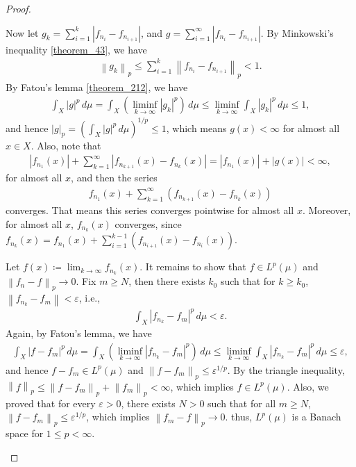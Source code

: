 \documentclass[11pt]{book}
\theoremstyle{definition}
\numberwithin{equation}{chapter}
\begin{document}
\begin{proof}
\begin{enumerate}[label=(\alph*)]
    Now let $g_k = \sum^k_{i=1} \left|f_{n_i} - f_{n_{i+1}}\right|$, and $g = \sum^\infty_{i=1} \left|f_{n_i} - f_{n_{i+1}}\right|$. By Minkowski's inequality \ref{theorem_43}, we have
    \begin{align*}
        \left\|g_k\right\|_p \leq \sum^k_{i=1} \left\|f_{n_i} - f_{n_{i+1}}\right\|_p < 1.
    \end{align*}
    By Fatou's lemma \ref{theorem_212}, we have
    \begin{align*}
        \int_X \left|g\right|^p\,d\mu = \int_X \left(\liminf_{k\to\infty} \left|g_k\right|^p\right) \,d\mu \leq \liminf_{k\to\infty} \int_X \left|g_k\right|^p\,d\mu \leq 1,
    \end{align*}
    and hence $\left|g\right|_p = \left(\int_X \left|g\right|^p\,d\mu\right)^{1/p} \leq 1$, which means $g(x) < \infty$ for almost all $x \in X$. Also, note that
    \begin{align*}
        \left|f_{n_1}(x)\right| + \sum^\infty_{k=1} \left|f_{n_{k+1}}(x) - f_{n_k}(x)\right| = \left|f_{n_1}(x)\right| + \left|g(x)\right| < \infty,
    \end{align*}
    for almost all $x$, and then the series
    \begin{align*}
        f_{n_1}(x) + \sum^\infty_{k=1} \left(f_{n_{k+1}}(x) - f_{n_k}(x)\right)
    \end{align*}
    converges. That means this series converges pointwise for almost all $x$. Moreover, for almost all $x$, $f_{n_k}(x)$ converges, since $f_{n_k}(x) = f_{n_1}(x) + \sum^{k-1}_{i=1} \left(f_{n_{i+1}}(x) - f_{n_i}(x)\right)$. 

    Let $f(x) \coloneqq \lim_{k\to\infty} f_{n_k}(x)$. It remains to show that $f \in L^p(\mu)$ and $\left\|f_n - f\right\|_p \to 0$. Fix $m \geq N$, then there exists $k_0$ such that for $k \geq k_0$, $\left\|f_{n_k} - f_m \right\| < \varepsilon$, i.e.,
    \begin{align*}
        \int_X \left|f_{n_k} - f_m \right|^p \,d\mu < \varepsilon.
    \end{align*}
    Again, by Fatou's lemma, we have
    \begin{align*}
        \int_X \left|f - f_m \right|^p \,d\mu = \int_X \left(\liminf_{k\to\infty} \left|f_{n_k} - f_m \right|^p \right) \,d\mu \leq \liminf_{k\to\infty} \int_X \left|f_{n_k} - f_m \right|^p \,d\mu \leq \varepsilon,
    \end{align*}
    and hence $f - f_m \in L^p(\mu)$ and $\left\|f - f_m \right\|_p \leq \varepsilon^{1/p}$. By the triangle inequality, $\left\|f\right\|_p \leq \left\|f - f_m \right\|_p + \left\|f_m \right\|_p < \infty$, which implies $f \in L^p(\mu)$. Also, we proved that for every $\varepsilon > 0$, there exists $N > 0$ such that for all $m \geq N$, $\left\|f - f_m \right\|_p \leq \varepsilon^{1/p}$, which implies $\left\|f_m - f\right\|_p \to 0$. thus, $L^p(\mu)$ is a Banach space for $1 \leq p < \infty$.
    

\end{enumerate}
\end{proof}
\end{document}

